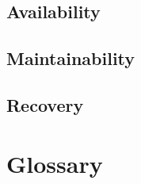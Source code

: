 \documentclass[12pt]{article}
\begin{document}
	
	\subsection{Availability}


	
	\subsection{Maintainability}



	\subsection{Recovery}



\section{Glossary}
\end{document}
